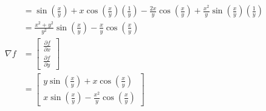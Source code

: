 \documentclass{article}
\begin{document}
\begin{enumerate}
\begin{enumerate}
\begin{align*}
   &= \sin(\frac{x}{y}) + x\cos(\frac{x}{y})(\frac{1}{y}) - \frac{2x}{y}\cos(\frac{x}{y}) + \frac{x^2}{y}\sin(\frac{x}{y})(\frac{1}{y}) \\
   &= \frac{x^2+y^2}{y^2}\sin(\frac{x}{y}) - \frac{x}{y}\cos(\frac{x}{y}) \\
   \nabla f
   &= \begin{bmatrix}
       \frac{\partial f}{\partial x} \\
       \frac{\partial f}{\partial y}
      \end{bmatrix} \\
   &= \begin{bmatrix}
       y\sin(\frac{x}{y}) + x\cos(\frac{x}{y}) \\
       x\sin(\frac{x}{y}) - \frac{x^2}{y}\cos(\frac{x}{y})
      \end{bmatrix}
  \end{align*}


\end{enumerate}
\end{enumerate}
\end{document}
